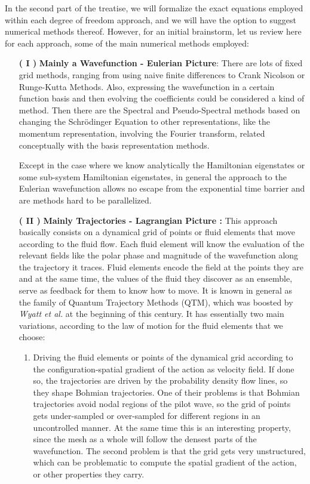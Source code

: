 \documentclass[11pt, a4paper]{article} %
\begin{document}
In the second part of the treatise, we will formalize the exact equations employed within each degree of freedom approach, and we will have the option to suggest numerical methods thereof. However, for an initial brainstorm, let us review here for each approach, some of the main numerical methods employed:\vspace{-0.2cm}
\begin{enumerate}
\item[\bf ( I )] {\bf Mainly a Wavefunction - Eulerian Picture}: There are lots of fixed grid methods, ranging from using naive finite differences to Crank Nicolson or Runge-Kutta Methods. Also, expressing the wavefunction in a certain function basis and then evolving the coefficients could be considered a kind of method. Then there are the Spectral and Pseudo-Spectral methods based on changing the Schrödinger Equation to other representations, like the momentum representation, involving the Fourier transform, related conceptually with the basis representation methods. 

Except in the case where we know analytically the Hamiltonian eigenstates or some sub-system Hamiltonian eigenstates, in general the approach to the Eulerian wavefunction allows no escape from the exponential time barrier and are methods hard to be parallelized.

\item [\bf ( II )] {\bf Mainly Trajectories - Lagrangian Picture :} This approach basically consists on a dynamical grid of points or fluid elements that move according to the fluid flow. Each fluid element will know the evaluation of the relevant fields like the polar phase and magnitude of the wavefunction along the trajectory it traces. Fluid elements encode the field at the points they are and at the same time, the values of the fluid they discover as an ensemble, serve as feedback for them to know how to move. It is known in general as the family of Quantum Trajectory Methods (QTM), which was boosted by {\em Wyatt et al.} at the beginning of this century. It has essentially two main variations, according to the law of motion for the fluid elements that we choose:
\begin{enumerate}
\item Driving the fluid elements or points of the dynamical grid  according to the configuration-spatial gradient of the action as velocity field. If done so, the trajectories are driven by the probability density flow lines, so they shape Bohmian trajectories. One of their problems is that Bohmian trajectories avoid nodal regions of the pilot wave, so the grid of points gets under-sampled or over-sampled for different regions in an uncontrolled manner. At the same time this is an interesting property, since the mesh as a whole will follow the densest parts of the wavefunction. The second problem is that the grid gets very unstructured, which can be problematic to compute the spatial gradient of the action, or other properties they carry.


\end{enumerate}
\end{enumerate}
\end{document}
